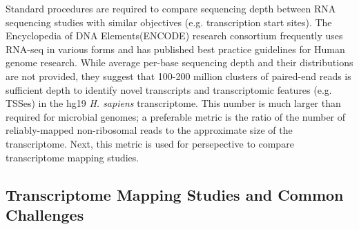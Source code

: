 Standard procedures are required to compare sequencing depth between RNA sequencing studies with similar objectives (e.g. transcription start sites). The Encyclopedia of DNA Elements(ENCODE) research consortium frequently uses RNA-seq in various forms\cite{168,169} and has published best practice guidelines for Human genome research.\cite{110} While average per-base sequencing depth and their distributions are not provided, they suggest that 100-200 million clusters of paired-end reads is sufficient depth to identify novel transcripts and transcriptomic features (e.g. TSSes) in the hg19 \textit{H. sapiens} transcriptome. This number is much larger than required for microbial genomes; a preferable metric is the ratio of the number of reliably-mapped non-ribosomal reads to the approximate size of the transcriptome. Next, this metric is used for persepective to compare transcriptome mapping studies.

\subsection{Transcriptome Mapping Studies and Common Challenges}

